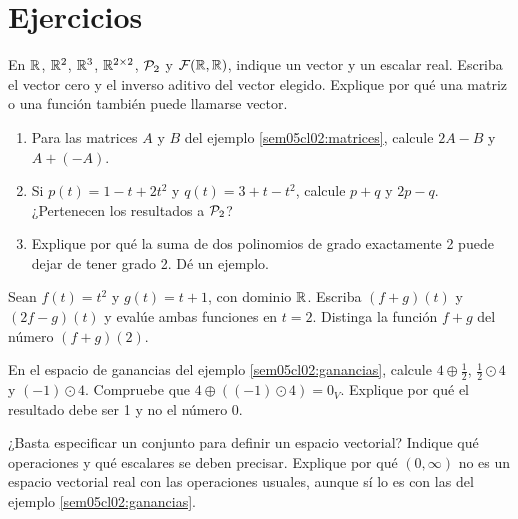 \documentclass[compacto,10pt]{pubciencias-notas}
\begin{document}
\section{Ejercicios}

\begin{ejer}
    En $\R$, $\R^2$, $\R^3$, $\Mat[\R]{2}{2}$, $\Pol_2$ y
    $\mathcal{F}(\R,\R)$, indique un vector y un escalar real.
    Escriba el vector cero y el inverso aditivo del vector elegido.
    Explique por qué una matriz o una función también puede llamarse vector.
\end{ejer}

\begin{ejer}
    \begin{enumerate}
        \item Para las matrices $A$ y $B$ del ejemplo
              \ref{sem05cl02:matrices}, calcule $2A-B$ y $A+(-A)$.
        \item Si $p(t)=1-t+2t^2$ y $q(t)=3+t-t^2$, calcule
              $p+q$ y $2p-q$. ¿Pertenecen los resultados a $\Pol_2$?
        \item Explique por qué la suma de dos polinomios de grado
              exactamente 2 puede dejar de tener grado 2. Dé un ejemplo.
    \end{enumerate}
\end{ejer}

\begin{ejer}
    Sean $f(t)=t^2$ y $g(t)=t+1$, con dominio $\R$.
    Escriba $(f+g)(t)$ y $(2f-g)(t)$ y evalúe ambas funciones en $t=2$.
    Distinga la función $f+g$ del número $(f+g)(2)$.
\end{ejer}

\begin{ejer}
    En el espacio de ganancias del ejemplo \ref{sem05cl02:ganancias},
    calcule $4\oplus\tfrac12$, $\tfrac12\odot4$ y $(-1)\odot4$.
    Compruebe que $4\oplus((-1)\odot4)=0_V$.
    Explique por qué el resultado debe ser 1 y no el número 0.
\end{ejer}

\begin{ejer}
    ¿Basta especificar un conjunto para definir un espacio vectorial?
    Indique qué operaciones y qué escalares se deben precisar.
    Explique por qué $(0,\infty)$ no es un espacio vectorial real con
    las operaciones usuales, aunque sí lo es con las del ejemplo
    \ref{sem05cl02:ganancias}.
\end{ejer}
\end{document}
